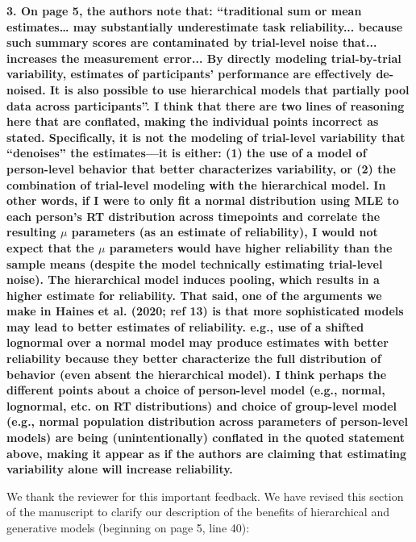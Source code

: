 \documentclass[a4paper,12pt]{article}
\begin{document}
\textbf{3. On page 5, the authors note that: ``traditional sum or mean estimates… may substantially underestimate task reliability... because such summary scores are contaminated by trial-level noise that... increases the measurement error... By directly modeling trial-by-trial variability, estimates of participants' performance are effectively de-noised. It is also possible to use hierarchical models that partially pool data across participants''. I think that there are two lines of reasoning here that are conflated, making the individual points incorrect as stated. Specifically, it is not the modeling of trial-level variability that ``denoises'' the estimates—it is either: (1) the use of a model of person-level behavior that better characterizes variability, or (2) the combination of trial-level modeling with the hierarchical model. In other words, if I were to only fit a normal distribution using MLE to each person’s RT distribution across timepoints and correlate the resulting $\mu$ parameters (as an estimate of reliability), I would not expect that the $\mu$ parameters would have higher reliability than the sample means (despite the model technically estimating trial-level noise). The hierarchical model induces pooling, which results in a higher estimate for reliability. That said, one of the arguments we make in Haines et al. (2020; ref 13) is that more sophisticated models may lead to better estimates of reliability. e.g., use of a shifted lognormal over a normal model may produce estimates with better reliability because they better characterize the full distribution of behavior (even absent the hierarchical model). I think perhaps the different points about a choice of person-level model (e.g., normal, lognormal, etc. on RT distributions) and choice of group-level model (e.g., normal population distribution across parameters of person-level models) are being (unintentionally) conflated in the quoted statement above, making it appear as if the authors are claiming that estimating variability alone will increase reliability.}

We thank the reviewer for this important feedback. We have revised this section of the manuscript to clarify our description of the benefits of hierarchical and generative models (beginning on page 5, line 40):
\end{document}
